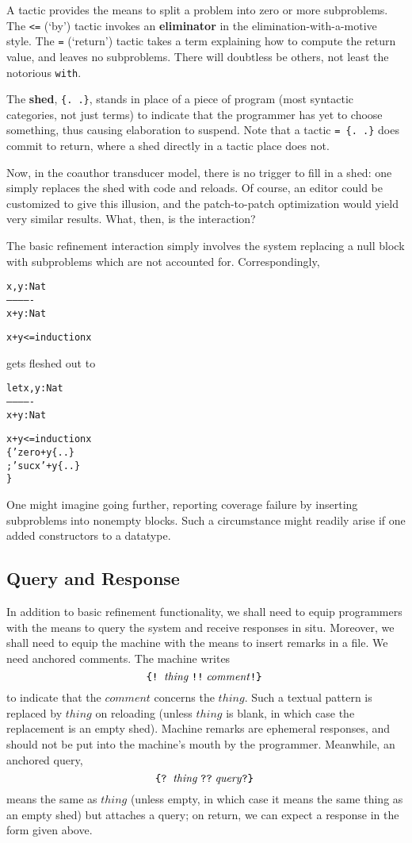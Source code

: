 \documentclass{article}
\begin{document}
A tactic provides the means to split a problem into zero or more
subproblems. The \texttt{<=} (`by') tactic invokes an \textbf{eliminator}
in the elimination-with-a-motive style. The \texttt{=} (`return') tactic
takes a term explaining how to compute the return value, and leaves no
subproblems. There will doubtless be others, not least the notorious
\texttt{with}.

The \textbf{shed}, \texttt{\{. .\}}, stands in place of a piece of program
(most syntactic categories, not just terms) to indicate that the programmer
has yet to choose something, thus causing elaboration to suspend. Note
that a tactic \texttt{= \{. .\}} does commit to return, where a
shed directly in a tactic place does not.

Now, in the coauthor transducer model, there is no trigger to fill in
a shed: one simply replaces the shed with code and reloads. Of course,
an editor could be customized to give this illusion, and the
patch-to-patch optimization would yield very similar results. What,
then, is the interaction?

The basic refinement interaction simply involves the system replacing
a null block with subproblems which are not accounted for.
Correspondingly,

\begin{alltt}
 x , y : Nat
-------------
 x + y : Nat

x + y <= induction x
\end{alltt}
%
gets fleshed out to
%
\begin{alltt}
let   x , y : Nat
     -------------
      x + y : Nat

x + y <= induction x
\{ 'zero + y    \{. .\}
; 'suc x' + y  \{. .\} 
\}
\end{alltt}

One might imagine going further, reporting coverage failure by inserting
subproblems into nonempty blocks. Such a circumstance might readily
arise if one added constructors to a datatype.


\subsection{Query and Response}

In addition to basic refinement functionality, we shall need to equip
programmers with the means to query the system and receive responses
in situ. Moreover, we shall need to equip the machine with the means
to insert remarks in a file. We need anchored comments. The machine
writes
\[
\texttt{\{!}\;\; \mathit{thing}\; \texttt{!!}\; \mathit{comment} \texttt{!\}}\;
\]
to indicate that the \(\mathit{comment}\) concerns the \(\mathit{thing}\).
Such a textual pattern is replaced by \(\mathit{thing}\) on reloading
(unless \(\mathit{thing}\) is blank, in which case the replacement is an
empty shed). Machine remarks are ephemeral responses, and should not be
put into the machine's mouth by the programmer. Meanwhile, an anchored query,
\[
\texttt{\{?}\;\; \mathit{thing}\; \texttt{??}\; \mathit{query} \texttt{?\}}\;
\]
means the same as \(\mathit{thing}\) (unless empty, in which case it means
the same thing as an empty shed) but attaches a query; on return, we can
expect a response in the form given above.
\end{document}

